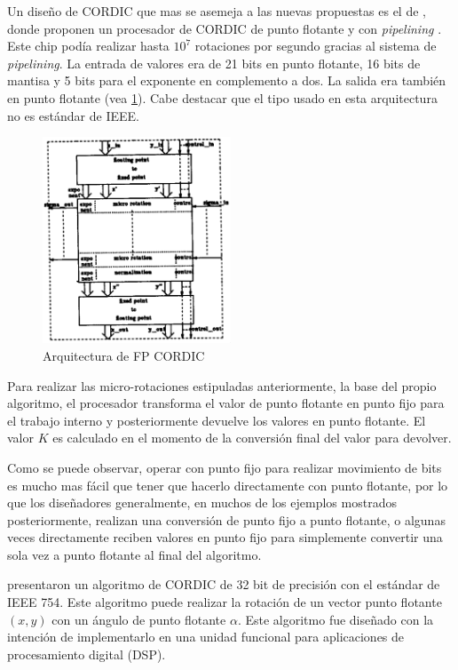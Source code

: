 Un diseño de CORDIC que mas se asemeja a las nuevas propuestas es el de \cite{de_lange_optimal_1988}, donde proponen un procesador de CORDIC de punto flotante y con \textit{pipelining} . Este chip podía realizar hasta $10^7$ rotaciones por segundo gracias al sistema de \textit{pipelining}. La entrada de valores era de 21 bits en punto flotante, 16 bits de mantisa y 5 bits para el exponente en complemento a dos. La salida era también en punto flotante (vea \ref{graf:Arq_FP_CORDIC}). Cabe destacar que el tipo usado en esta arquitectura no es estándar de IEEE.

\begin{figure}[ht]
	\centering
	\includegraphics[width=0.5\textwidth]{archivos/CORDIC/1988_FP_CORDIC_Architecture.png}
	\caption{Arquitectura de FP CORDIC}
	\label{graf:Arq_FP_CORDIC}
\end{figure}

Para realizar las micro-rotaciones estipuladas anteriormente, la base del propio algoritmo, el procesador transforma el valor de punto flotante en punto fijo para el trabajo interno y posteriormente devuelve los valores en punto flotante. El valor $K$ es calculado en el momento de la conversión final del valor para devolver.

Como se puede observar, operar con punto fijo para realizar movimiento de bits es mucho mas fácil que tener que hacerlo directamente con punto flotante, por lo que los diseñadores generalmente, en muchos de los ejemplos mostrados posteriormente, realizan una conversión de punto fijo a punto flotante, o algunas veces directamente reciben valores en punto fijo para simplemente convertir una sola vez a punto flotante al final del algoritmo.

\cite{hekstra_floating_1993} presentaron un algoritmo de CORDIC de 32 bit de precisión con el estándar de IEEE 754. Este algoritmo puede realizar la rotación de un vector punto flotante $(x,y)$ con un ángulo de punto flotante $\alpha$. Este algoritmo fue diseñado con la intención de implementarlo en una unidad funcional para aplicaciones de procesamiento digital (DSP).

